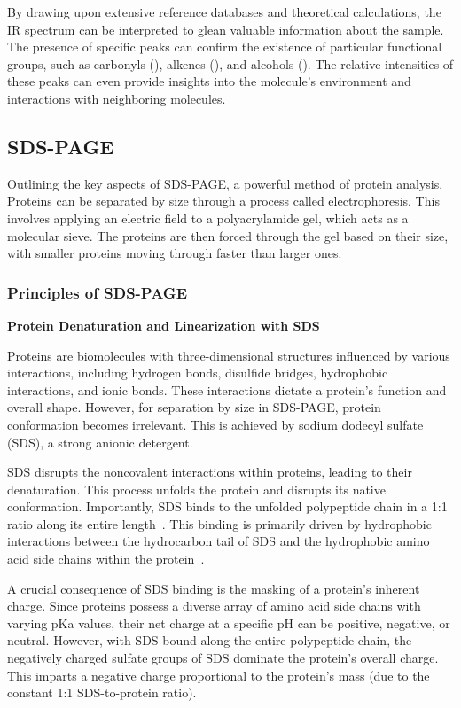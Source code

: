 By drawing upon extensive reference databases and theoretical calculations, the IR spectrum
can be interpreted to glean valuable information about the sample.
The presence of specific peaks can confirm the existence of particular functional groups, such as carbonyls (), alkenes (), and alcohols ().
The relative intensities of these peaks can even provide insights into the molecule's environment and interactions with neighboring molecules.

\subsection{SDS-PAGE\authorB}
Outlining the key aspects of SDS-PAGE, a powerful method of protein analysis.
Proteins can be separated by size through a process called electrophoresis.
This involves applying an electric field to a polyacrylamide gel, which acts as a molecular sieve.
The proteins are then forced through the gel based on their size, with smaller proteins moving through faster than larger ones.

\subsubsection{Principles of SDS-PAGE}

\textbf{Protein Denaturation and Linearization with SDS}

Proteins are biomolecules with three-dimensional structures influenced by various interactions, including hydrogen bonds, disulfide bridges, hydrophobic interactions, and ionic bonds.
These interactions dictate a protein's function and overall shape.
However, for separation by size in SDS-PAGE, protein conformation becomes irrelevant.
This is achieved by sodium dodecyl sulfate (SDS), a strong anionic detergent.

SDS disrupts the noncovalent interactions within proteins, leading to their denaturation.
This process unfolds the protein and disrupts its native conformation. Importantly, SDS
binds to the unfolded polypeptide chain in a 1:1 ratio along its entire length~\cite{sdspageassay}. This
binding is primarily driven by hydrophobic interactions between the hydrocarbon tail of
SDS and the hydrophobic amino acid side chains within the protein~\cite{sdsimpact}.

A crucial consequence of SDS binding is the masking of a protein's inherent charge. Since
proteins possess a diverse array of amino acid side chains with varying pKa values, their
net charge at a specific pH can be positive, negative, or neutral. However, with SDS bound
along the entire polypeptide chain, the negatively charged sulfate groups of SDS
dominate the protein's overall charge. This imparts a negative charge proportional to the
protein's mass (due to the constant 1:1 SDS-to-protein ratio).

